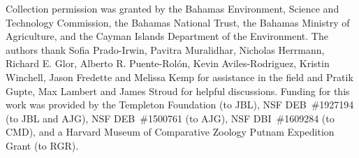 Collection permission was granted by the Bahamas Environment, Science and Technology Commission, the Bahamas National Trust, the Bahamas Ministry of Agriculture, and the Cayman Islands Department of the Environment. The authors thank Sofia Prado-Irwin, Pavitra Muralidhar, Nicholas Herrmann, Richard E. Glor, Alberto R. Puente-Rol\'{o}n, Kevin Aviles-Rodriguez, Kristin Winchell, Jason Fredette and Melissa Kemp for assistance in the field and Pratik Gupte, Max Lambert and James Stroud for helpful discussions. Funding for this work was provided by the Templeton Foundation (to JBL), NSF DEB~\#1927194 (to JBL and AJG), NSF DEB~\#1500761 (to AJG), NSF DBI~\#1609284 (to CMD), and a Harvard Museum of Comparative Zoology Putnam Expedition Grant (to RGR).